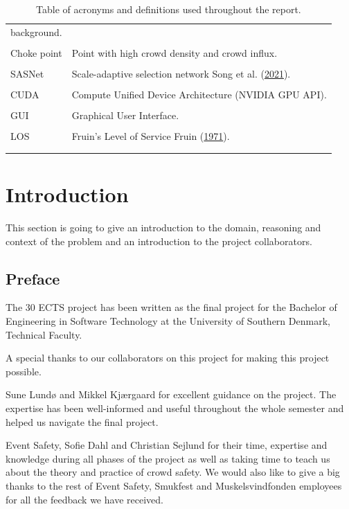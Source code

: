 \documentclass[
]{article}
\begin{document}
\begin{longtable}[]{@{}
  >{\raggedright\arraybackslash}p{}
  >{\raggedright\arraybackslash}p{}@{}}
background. \\
& \\
Choke point & Point with high crowd density and crowd influx. \\
& \\
SASNet & Scale-adaptive selection network Song et al.
(\protect\hyperlink{ref-sasnet}{2021}). \\
& \\
CUDA & Compute Unified Device Architecture (NVIDIA GPU API). \\
& \\
GUI & Graphical User Interface. \\
& \\
LOS & Fruin's Level of Service Fruin
(\protect\hyperlink{ref-fruin1971pedestrian}{1971}). \\
& \\
\caption{\label{tbl-acronyms}Table of acronyms and definitions used
throughout the report.}\tabularnewline
\end{longtable}

\newpage{}

\hypertarget{introduction}{%
\section{Introduction}\label{introduction}}

This section is going to give an introduction to the domain, reasoning
and context of the problem and an introduction to the project
collaborators.

\hypertarget{preface}{%
\subsection{Preface}\label{preface}}

The 30 ECTS project has been written as the final project for the
Bachelor of Engineering in Software Technology at the University of
Southern Denmark, Technical Faculty.

A special thanks to our collaborators on this project for making this
project possible.

Sune Lundø and Mikkel Kjærgaard for excellent guidance on the project.
The expertise has been well-informed and useful throughout the whole
semester and helped us navigate the final project.

Event Safety, Sofie Dahl and Christian Sejlund for their time, expertise
and knowledge during all phases of the project as well as taking time to
teach us about the theory and practice of crowd safety. We would also
like to give a big thanks to the rest of Event Safety, Smukfest and
Muskelsvindfonden employees for all the feedback we have received.
\end{document}
